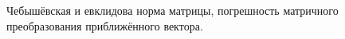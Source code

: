 \documentclass[__main__.tex]{subfiles}
\begin{document}
Чебышёвская и евклидова норма матрицы, погрешность матричного преобразования приближённого вектора.
\end{document}
